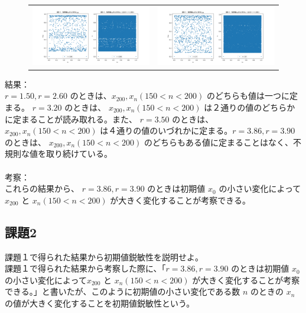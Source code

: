 \begin{figure}[htbp]
\begin{tabular}{cc}
    \begin{minipage}[t]{0.45\hsize}
      \centering
      \includegraphics[keepaspectratio, scale=0.25]{images/Problem2/ctest3_5.png}
    \end{minipage} &
    \begin{minipage}[t]{0.45\hsize}
      \centering
      \includegraphics[keepaspectratio, scale=0.25]{images/Problem2/ctest3_6.png}
    \end{minipage}
  \end{tabular}
\end{figure}


結果：\\
$r = 1.50, r = 2.60$ のときは、$x_{200}, x_n (150 < n < 200)$ のどちらも値は一つに定まる。 $r = 3.20$ のときは、 $x_{200}, x_n (150 < n < 200)$ は２通りの値のどちらかに定まることが読み取れる。また、 $r = 3.50$ のときは、 $x_{200}, x_n (150 < n < 200)$ は４通りの値のいづれかに定まる。$r = 3.86, r = 3.90$ のときは、 $x_{200}, x_n (150 < n < 200)$ のどちらもある値に定まることはなく、不規則な値を取り続けている。\\\\

考察：\\
これらの結果から、 $r = 3.86, r = 3.90$ のときは初期値 $x_0$ の小さい変化によって$x_{200}$ と $x_n (150 < n < 200)$ が大きく変化することが考察できる。

\subsection{課題2}
課題１で得られた結果から初期値鋭敏性を説明せよ。\\
課題１で得られた結果から考察した際に、「$r = 3.86, r = 3.90$ のときは初期値 $x_0$ の小さい変化によって$x_{200}$ と $x_n (150 < n < 200)$ が大きく変化することが考察できる。」と書いたが、このように初期値の小さい変化である数 $n$ のときの $x_n$ の値が大きく変化することを初期値鋭敏性という。

